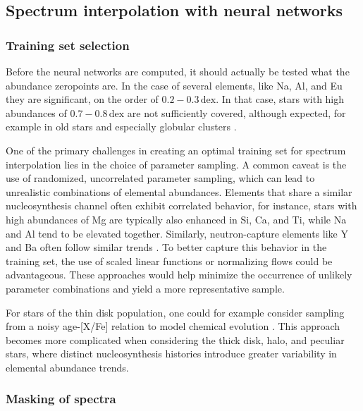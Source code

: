 \documentclass[
  journal=pasa,
  manuscript=research-paper, %
  year=2024,
  volume=37
]{cup-journal}
\begin{document}
\subsection{Spectrum interpolation with neural networks} \label{sec:caveats_interpolation}

\subsubsection{Training set selection}

Before the neural networks are computed, it should actually be tested what the abundance zeropoints are. In the case of several elements, like Na, Al, and Eu they are significant, on the order of $0.2-0.3\,\mathrm{dex}$. In that case, stars with high abundances of $0.7-0.8\,\mathrm{dex}$ are not sufficiently covered, although expected, for example in old stars and especially globular clusters \citep[see e.g.][]{Carretta2009}.

One of the primary challenges in creating an optimal training set for spectrum interpolation lies in the choice of parameter sampling. A common caveat is the use of randomized, uncorrelated parameter sampling, which can lead to unrealistic combinations of elemental abundances. Elements that share a similar nucleosynthesis channel often exhibit correlated behavior, for instance, stars with high abundances of Mg are typically also enhanced in Si, Ca, and Ti, while Na and Al tend to be elevated together. Similarly, neutron-capture elements like Y and Ba often follow similar trends \citep[e.g.][]{Ting2012, Kobayashi2020, Buder2021}. To better capture this behavior in the training set, the use of scaled linear functions or normalizing flows could be advantageous. These approaches would help minimize the occurrence of unlikely parameter combinations and yield a more representative sample. 

For stars of the thin disk population, one could for example consider sampling from a noisy age-[X/Fe] relation to model chemical evolution \citep[see Fig.~\ref{fig:galah_dr4_age_xfe_trends_solar_twins_allstar},][]{Nissen2015, Spina2016, Bedell2018}. This approach becomes more complicated when considering the thick disk, halo, and peculiar stars, where distinct nucleosynthesis histories introduce greater variability in elemental abundance trends.

\subsubsection{Masking of spectra} \label{sec:masking_spectra}
\end{document}
